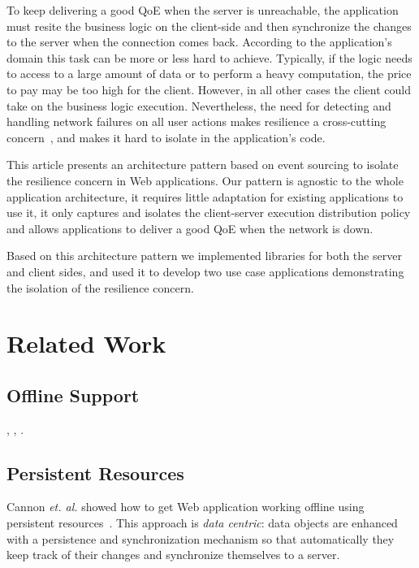 \documentclass{llncs}
\begin{document}
To keep delivering a good QoE when the server is unreachable, the application must resite the business logic on the client-side and then synchronize the changes to the server when the connection comes back. According to the application's domain this task can be more or less hard to achieve. Typically, if the logic needs to access to a large amount of data or to perform a heavy computation, the price to pay may be too high for the client. However, in all other cases the client could take on the business logic execution. Nevertheless, the need for detecting and handling network failures on all user actions makes resilience a cross-cutting concern~\cite{Kiczales97_AOP}, and makes it hard to isolate in the application's code.

This article presents an architecture pattern based on event sourcing to isolate the resilience concern in Web applications. Our pattern is agnostic to the whole application architecture, it requires little adaptation for existing applications to use it, it only captures and isolates the client-server execution distribution policy and allows applications to deliver a good QoE when the network is down.

Based on this architecture pattern we implemented libraries for both the server and client sides, and used it to develop two use case applications demonstrating the isolation of the resilience concern.

\section{Related Work}

\cite{Zhang10_ElasticMobile}

\subsection{Offline Support}

\cite{Yang2000_OfflineMode}, \cite{Marco11_InterruptionResilience}, \cite{Kao12_WOPRE}.

\subsection{Persistent Resources}

Cannon \emph{et. al.} showed how to get Web application working offline using persistent resources~\cite{Cannon10_Persistence}. This approach is \emph{data centric}: data objects are enhanced with a persistence and synchronization mechanism so that automatically they keep track of their changes and synchronize themselves to a server.
\end{document}
